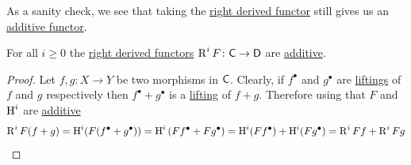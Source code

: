 \documentclass[../../main]{subfiles}
\begin{document}
As a sanity check, we see that taking the \hyperref[def:right-derived-functor]{right derived functor} still gives us an \hyperref[def:additive-functor]{additive functor}.
\begin{proposition}
  For all \(i \geq 0\) the \hyperref[def:right-derived-functor]{right derived functors} \(\operatorname{R}^{i}F\colon \mathsf{C} \to \mathsf{D}\) are \hyperref[def:additive-functor]{additive}.
\end{proposition}
\begin{proof}
  Let \(f, g\colon X \to Y\) be two morphisms in \(\mathsf{C}\).
  Clearly, if \(f^{\bullet}\) and \(g^{\bullet}\) are \hyperref[thm:existence-of-lifting]{liftings} of \(f\) and \(g\) respectively then \(f^{\bullet} + g^{\bullet}\) is a \hyperref[thm:existence-of-lifting]{lifting} of \(f + g\).
  Therefore using that \(F\) and \(\operatorname{H}^{i}\) are \hyperref[def:additive-functor]{additive}
  \begin{equation*}
    \operatorname{R}^{i}F(f + g) = \operatorname{H}^{i}(F(f^{\bullet} + g^{\bullet})) = \operatorname{H}^{i} \left( Ff^{\bullet} + Fg^{\bullet} \right) = \operatorname{H}^{i}(Ff^{\bullet}) + \operatorname{H}^{i}(Fg^{\bullet}) = \operatorname{R}^{i}Ff + \operatorname{R}^{i}Fg
  \end{equation*}
\end{proof}
\end{document}
